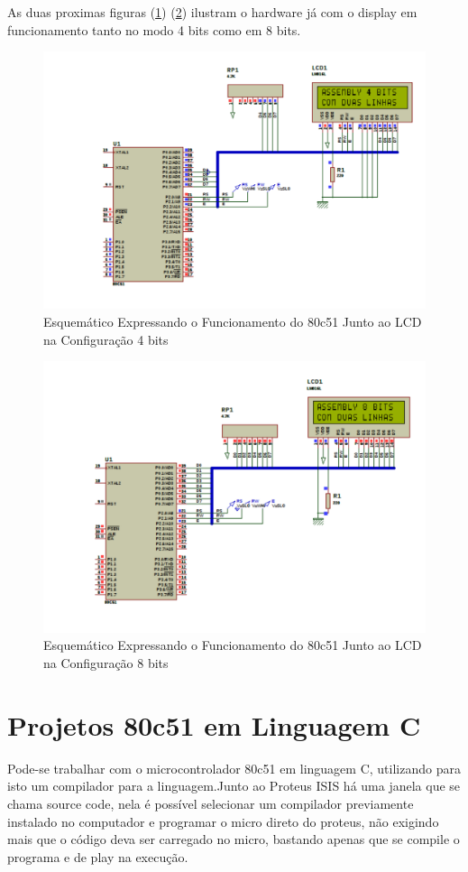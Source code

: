 \documentclass{Fabiano_file}
\begin{document}
{\pagebreak

As duas proximas figuras (\ref{fig:lcd_4_bits}) (\ref{fig:lcd_8_bits}) ilustram o hardware já com o display em funcionamento tanto no modo 4 bits como em 8 bits.

\begin{figure}[h!]
\centering
\includegraphics[width=.87\textwidth]{lcd_4_bits.pdf}
\caption{Esquemático Expressando o Funcionamento do 80c51 Junto ao LCD na Configuração 4 bits}
\label{fig:lcd_4_bits}
\end{figure}


\begin{figure}[h!]
\centering
\includegraphics[width=.87\textwidth]{lcd_8_bits.pdf}
\caption{Esquemático Expressando o Funcionamento do 80c51 Junto ao LCD na Configuração 8 bits}
\label{fig:lcd_8_bits}
\end{figure}

\newpage

\section{Projetos 80c51 em Linguagem C}
Pode-se trabalhar com o microcontrolador 80c51 em linguagem C, utilizando para isto um compilador para a linguagem.Junto ao Proteus ISIS há uma janela que se
chama source code, nela é possível selecionar um compilador previamente instalado no computador e programar o micro direto do proteus, não exigindo mais que o
código deva ser carregado no micro, bastando apenas que se compile o programa e de play na execução.\\

}
\end{document}

